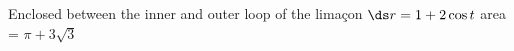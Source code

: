 {Enclosed between the inner and  outer loop of the lima\c con $\ds r=1+2\cos t$}
{area = $\pi+3\sqrt{3}$
}
